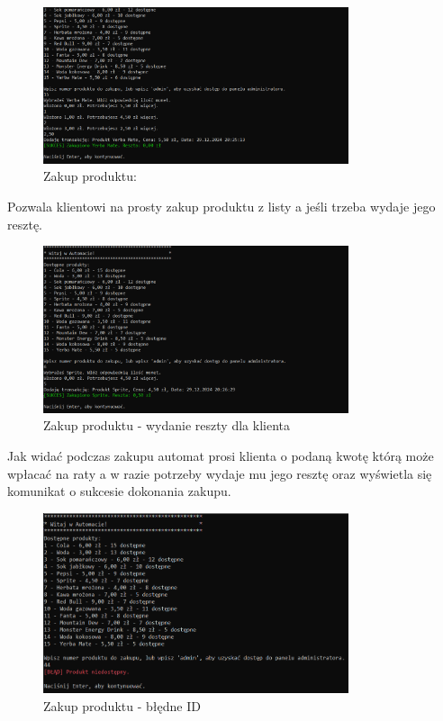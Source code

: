 \begin{figure}[H] 
    \centering
    \includegraphics[width=0.8\textwidth]{grafiki/zakup_produktu_bez_reszty.png}
    \caption{\footnotesize Zakup produktu:}	
    \label{fig:5.5}
\end{figure}



Pozwala klientowi na prosty zakup produktu z listy a jeśli trzeba wydaje jego resztę.


\begin{figure}[H] 
    \centering
    \includegraphics[width=0.8\textwidth]{grafiki/zakup_produktu_reszta.png}
    \caption{\footnotesize Zakup produktu - wydanie reszty dla klienta}	
    \label{fig:5.6}
\end{figure}

Jak widać podczas zakupu automat prosi klienta o podaną kwotę którą może wpłacać na raty a w razie potrzeby wydaje mu jego resztę oraz wyświetla się komunikat o sukcesie dokonania zakupu.



\begin{figure}[H] 
    \centering
    \includegraphics[width=0.8\textwidth]{grafiki/blad_zakupu.png}
    \caption{\footnotesize Zakup produktu - błędne ID}	
    \label{fig:5.7}
\end{figure}

